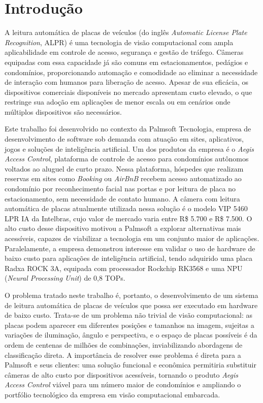 \chapter{Introdução}

A leitura automática de placas de veículos (do inglês \textit{Automatic License Plate Recognition}, ALPR) é uma tecnologia de visão computacional com ampla aplicabilidade em controle de acesso, segurança e gestão de tráfego. Câmeras equipadas com essa capacidade já são comuns em estacionamentos, pedágios e condomínios, proporcionando automação e comodidade ao eliminar a necessidade de interação com humanos para liberação de acesso. Apesar de sua eficácia, os dispositivos comerciais disponíveis no mercado apresentam custo elevado, o que restringe sua adoção em aplicações de menor escala ou em cenários onde múltiplos dispositivos são necessários.

Este trabalho foi desenvolvido no contexto da Palmsoft Tecnologia, empresa de desenvolvimento de software sob demanda com atuação em sites, aplicativos, jogos e soluções de inteligência artificial. Um dos produtos da empresa é o \textit{Aegis Access Control}, plataforma de controle de acesso para condomínios autônomos voltados ao aluguel de curto prazo. Nessa plataforma, hóspedes que realizam reservas em sites como \textit{Booking} ou \textit{AirBnB} recebem acesso automatizado ao condomínio por reconhecimento facial nas portas e por leitura de placa no estacionamento, sem necessidade de contato humano. A câmera com leitura automática de placas atualmente utilizada nessa solução é o modelo VIP 5460 LPR IA da Intelbras, cujo valor de mercado varia entre R\$ 5.700 e R\$ 7.500. O alto custo desse dispositivo motivou a Palmsoft a explorar alternativas mais acessíveis, capazes de viabilizar a tecnologia em um conjunto maior de aplicações. Paralelamente, a empresa demonstrou interesse em validar o uso de hardware de baixo custo para aplicações de inteligência artificial, tendo adquirido uma placa Radxa ROCK 3A, equipada com processador Rockchip RK3568 e uma NPU (\textit{Neural Processing Unit}) de 0,8 TOPs.

O problema tratado neste trabalho é, portanto, o desenvolvimento de um sistema de leitura automática de placas de veículos que possa ser executado em hardware de baixo custo. Trata-se de um problema não trivial de visão computacional: as placas podem aparecer em diferentes posições e tamanhos na imagem, sujeitas a variações de iluminação, ângulo e perspectiva, e o espaço de placas possíveis é da ordem de centenas de milhões de combinações, inviabilizando abordagens de classificação direta. A importância de resolver esse problema é direta para a Palmsoft e seus clientes: uma solução funcional e econômica permitiria substituir câmeras de alto custo por dispositivos acessíveis, tornando o produto \textit{Aegis Access Control} viável para um número maior de condomínios e ampliando o portfólio tecnológico da empresa em visão computacional embarcada.

